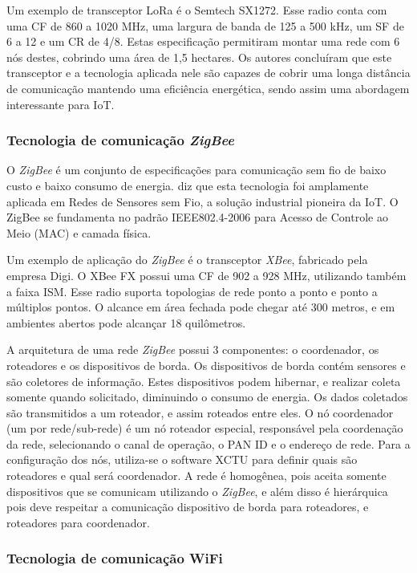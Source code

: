 \documentclass[
    hidelinks,
	12pt,				%
	openany,
	oneside, 
	a4paper,			%
	english,			%
	french,				%
	spanish,			%
	brazil				%
	]{abntex2}
\begin{document}
Um exemplo de transceptor LoRa é o Semtech SX1272. Esse radio conta com uma CF de 860 a 1020 MHz, uma largura de banda de 125 a 500 kHz, um SF de 6 a 12 e um CR de 4/8. Estas especificação permitiram \citeauthor{Bor:2016:LIT:2893711.2893802} montar uma rede com 6 nós destes, cobrindo uma área de 1,5 hectares. Os autores concluíram que este transceptor e a tecnologia aplicada nele são capazes de cobrir uma longa distância de comunicação mantendo uma eficiência energética, sendo assim uma abordagem interessante para IoT.

\subsubsection{Tecnologia de comunicação \textit{ZigBee}}

O \textit{ZigBee} é um conjunto de especificações para comunicação sem fio de baixo custo e baixo consumo de energia. \cite{palattella2016} diz que esta tecnologia foi amplamente aplicada em Redes de Sensores sem Fio, a solução industrial pioneira da IoT. O ZigBee se fundamenta no padrão IEEE802.4-2006 para Acesso de Controle ao Meio (MAC) e camada física.

Um exemplo de aplicação do \textit{ZigBee} é o transceptor \textit{XBee}, fabricado pela empresa Digi. O XBee FX possui uma CF de 902 a 928 MHz, utilizando também a faixa ISM. Esse radio suporta topologias de rede ponto a ponto e ponto a múltiplos pontos. O alcance em área fechada pode chegar até 300 metros, e em ambientes abertos pode alcançar 18 quilômetros.

A arquitetura de uma rede \textit{ZigBee} possui 3 componentes: o coordenador, os roteadores e os dispositivos de borda. Os dispositivos de borda contém sensores e são coletores de informação. Estes dispositivos podem hibernar, e realizar coleta somente quando solicitado, diminuindo o consumo de energia. Os dados coletados são transmitidos a um roteador, e assim roteados entre eles. O nó coordenador (um por rede/sub-rede) é um nó roteador especial, responsável pela coordenação da rede, selecionando o canal de operação, o PAN ID e o endereço de rede. Para a configuração dos nós, utiliza-se o software XCTU para definir quais são roteadores e qual será coordenador. A rede é homogênea, pois aceita somente dispositivos que se comunicam utilizando o \textit{ZigBee}, e além disso é hierárquica pois deve respeitar a comunicação dispositivo de borda para roteadores, e roteadores para coordenador.

\subsubsection{Tecnologia de comunicação WiFi}
\end{document}
